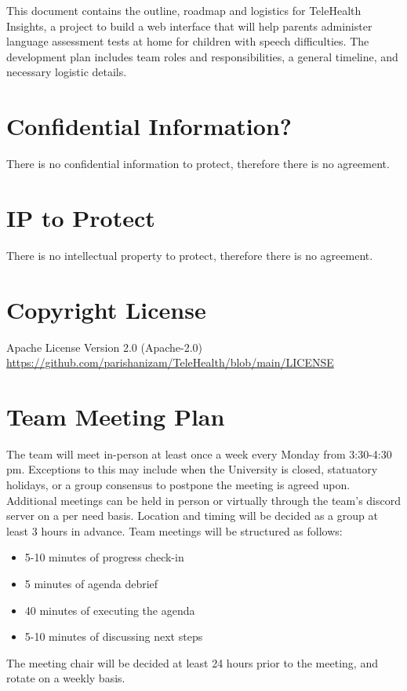 \documentclass{article}
\begin{document}
This document contains the outline, roadmap and logistics for TeleHealth Insights, a project to build a web 
interface that will help parents administer language assessment tests at home for children with speech
difficulties. The development plan includes team roles and responsibilities, a general timeline, and 
necessary logistic details.

\section{Confidential Information?}

There is no confidential information to protect, therefore there is no agreement.

\section{IP to Protect}

There is no intellectual property to protect, therefore there is no agreement.

\section{Copyright License}

Apache License Version 2.0 (Apache-2.0) \\
\url{https://github.com/parishanizam/TeleHealth/blob/main/LICENSE}

\section{Team Meeting Plan}

The team will meet in-person at least once a week every Monday from 3:30-4:30 pm. Exceptions to this 
may include when the University is closed, statuatory holidays, or a group consensus to postpone the meeting
is agreed upon. Additional meetings can be held in person or virtually through the team's discord server on 
a per need basis. Location and timing will be decided as a group at least 3 hours in advance. Team meetings will
be structured as follows:
\begin{itemize}
  \item 5-10 minutes of progress check-in 
  \item 5 minutes of agenda debrief
  \item 40 minutes of executing the agenda
  \item 5-10 minutes of discussing next steps
\end{itemize}
\indent The meeting chair will be decided at least 24 hours prior to the meeting, and rotate on a weekly basis.
\end{document}
